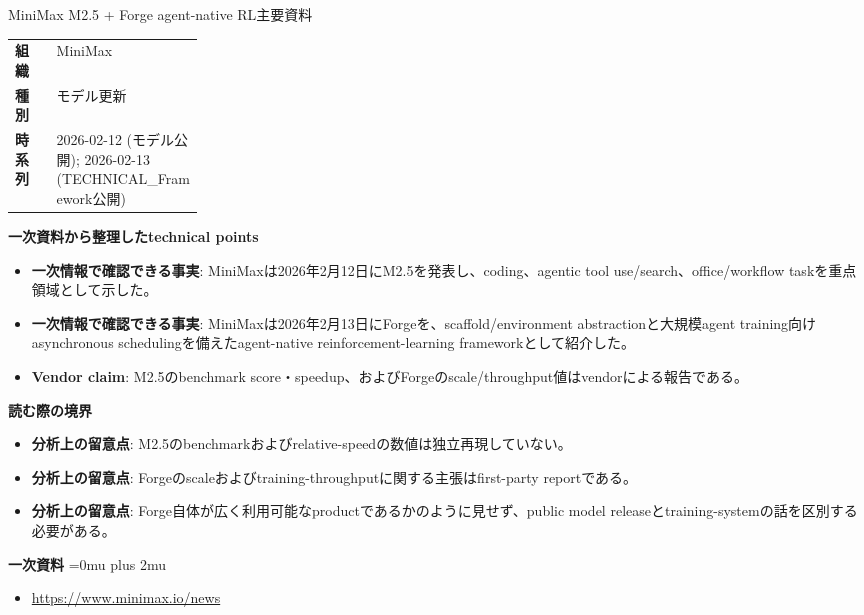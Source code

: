 \begin{technicalnote}{MiniMax M2.5 + Forge agent-native RL}{主要資料}
\begingroup
\begin{tabularx}{\linewidth}{@{}>{\bfseries}p{0.22\linewidth}X@{}}
組織 & MiniMax \\
種別 & モデル更新 \\
時系列 & 2026-02-12 (モデル公開); 2026-02-13 (TECHNICAL\_Framework公開) \\
\end{tabularx}
\smallskip
{\bfseries 一次資料から整理したtechnical points}
\begin{itemize}[leftmargin=1.5em,itemsep=0.35em]
\item \textbf{一次情報で確認できる事実}: MiniMaxは2026年2月12日にM2.5を発表し、coding、agentic tool use/search、office/workflow taskを重点領域として示した。
\item \textbf{一次情報で確認できる事実}: MiniMaxは2026年2月13日にForgeを、scaffold/environment abstractionと大規模agent training向けasynchronous schedulingを備えたagent-native reinforcement-learning frameworkとして紹介した。
\item \textbf{Vendor claim}: M2.5のbenchmark score・speedup、およびForgeのscale/throughput値はvendorによる報告である。
\end{itemize}
\begin{minipage}{\linewidth}
{\bfseries 読む際の境界}
\begin{itemize}[leftmargin=1.5em,itemsep=0.35em]
\item \textbf{分析上の留意点}: M2.5のbenchmarkおよびrelative-speedの数値は独立再現していない。
\item \textbf{分析上の留意点}: Forgeのscaleおよびtraining-throughputに関する主張はfirst-party reportである。
\item \textbf{分析上の留意点}: Forge自体が広く利用可能なproductであるかのように見せず、public model releaseとtraining-systemの話を区別する必要がある。
\end{itemize}
\begin{samepage}
{\bfseries 一次資料}
\begingroup\sloppy
\Urlmuskip=0mu plus 2mu\relax
\begin{itemize}[leftmargin=1.5em,itemsep=0.25em]
\item {\scriptsize\url{https://www.minimax.io/news}}
\end{itemize}
\endgroup
\end{samepage}
\end{minipage}
\endgroup
\end{technicalnote}
\medskip

